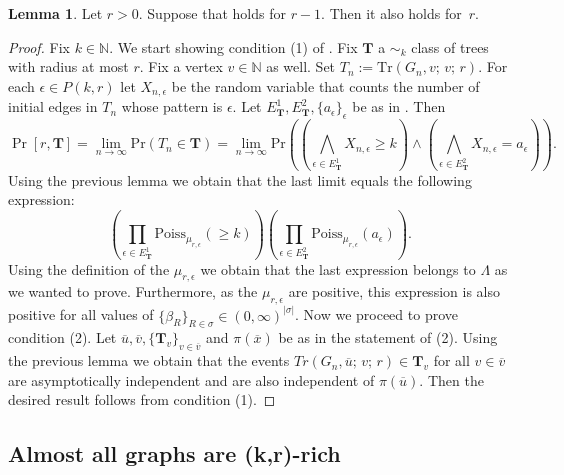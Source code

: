 \documentclass[12pt,notitlepage,a4paper]{article}
\theoremstyle{definition}
\newtheorem{lemma}{Lemma}[section]
\newcommand{\N}{\mathbb{N}}
\newcommand{\Ln}{\lim\limits_{n\to \infty}}
\newcommand{\Tr}{\mathrm{Tr}}
\newcommand{\sep}{\noindent\rule{2cm}{0.4pt}}
\begin{document}
\begin{lemma} \label{lem:singletreeprob}
Let $r>0$. Suppose that 
holds for $r-1$. Then it also holds for~$r$. 
\end{lemma}
\begin{proof}
Fix $k\in \N$. 
We start showing condition (1) of .
Fix $\mathbf{T}$ a $\sim_k$ class of trees with radius at most $r$. 
Fix a vertex $v\in \N$ as well. Set $T_n:=\Tr(G_n,v;\,v;\,r)$.
For each $\epsilon\in P(k,r)$ let
$X_{n,\epsilon}$ be the random 
variable that counts the number
of initial edges in $T_n$ whose pattern is 
$\epsilon$. Let $E^1_\mathbf{T}, E^2_\mathbf{T}, 
\{a_\epsilon\}_\epsilon$ be as in .
Then
\[
\Pr[r,\mathbf{T}]=
\Ln 
\mathrm{Pr}(T_n\in \mathbf{T})
=
\Ln
\mathrm{Pr}\left(
\left(
\bigwedge_{\epsilon\in E^1_\mathbf{T}}
X_{n,\epsilon}\geq k
\right) \wedge
\left(
\bigwedge_{\epsilon\in E^2_\mathbf{T}}
X_{n,\epsilon}= a_\epsilon
\right)
\right).
\]
Using the previous lemma we obtain that the last limit
equals the following expression:
\[ 
\left(
\prod_{\epsilon\in E^1_\mathbf{T}}
\mathrm{Poiss}_{\mu_{r,\epsilon}}(\geq k ) 
\right) 
\left(
\prod_{\epsilon\in E^2_\mathbf{T}}
\mathrm{Poiss}_{\mu_{r,\epsilon}}(a_\epsilon) 
\right).
\]
Using the definition of 
the $\mu_{r,\epsilon}$ we obtain that the last expression
belongs to $\Lambda$ as we wanted to prove. Furthermore,
as the $\mu_{r,\epsilon}$ are positive, this expression is also 
positive for all values of
$\{\beta_R\}_{R\in \sigma}\in (0,\infty)^{|\sigma|}$.
Now we proceed to prove condition (2). 
Let $\overline{u},\overline{v}, \{\mathbf{T}_v\}_{v\in \overline{v}}$
and $\pi(\overline{x})$ be as in the statement of (2). 
Using the previous lemma we obtain that the events
$Tr(G_n,\overline{u};\, v;\, r)\in \mathbf{T}_v$ for all $v\in \overline{v}$
are asymptotically independent and are also independent of $\pi(\overline{u})$. 
Then the desired result follows from condition (1). 
\end{proof}

\subsection{Almost all graphs are (k,r)-rich}
\end{document}
